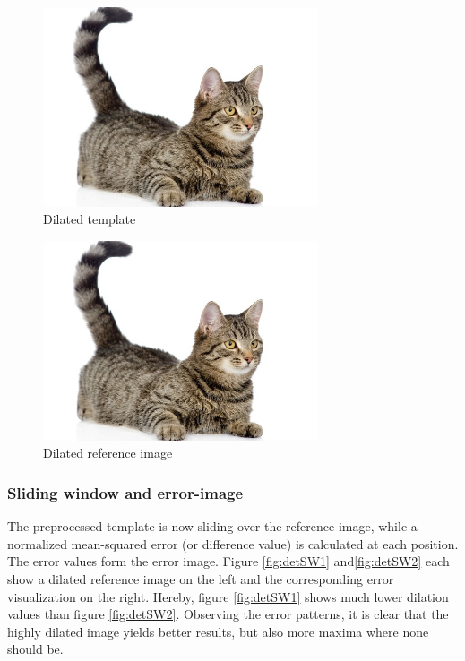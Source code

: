 \documentclass[10pt,twocolumn,letterpaper]{article}
\begin{document}
\begin{figure}[!ht]
\includegraphics[width = 3.2in]{img/cat.jpg}
\caption{Dilated template}
\label{fig:detPP1}
\end{figure}
\par

\begin{figure}[!ht]
\includegraphics[width = 3.2in]{img/cat.jpg}
\caption{Dilated reference image}
\label{fig:detPP2}
\end{figure}

\subsubsection*{Sliding window and error-image}

The preprocessed template is now sliding over the reference image, while a normalized mean-squared error (or difference value) is calculated at each position. The error values form the error image. Figure \ref{fig:detSW1} and\ref{fig:detSW2} each show a dilated reference image on the left and the corresponding error visualization on the right. Hereby, figure \ref{fig:detSW1} shows much lower dilation values than figure \ref{fig:detSW2}. Observing the error patterns, it is clear that the highly dilated image yields better results, but also more maxima where none should be.
\par
\end{document}
